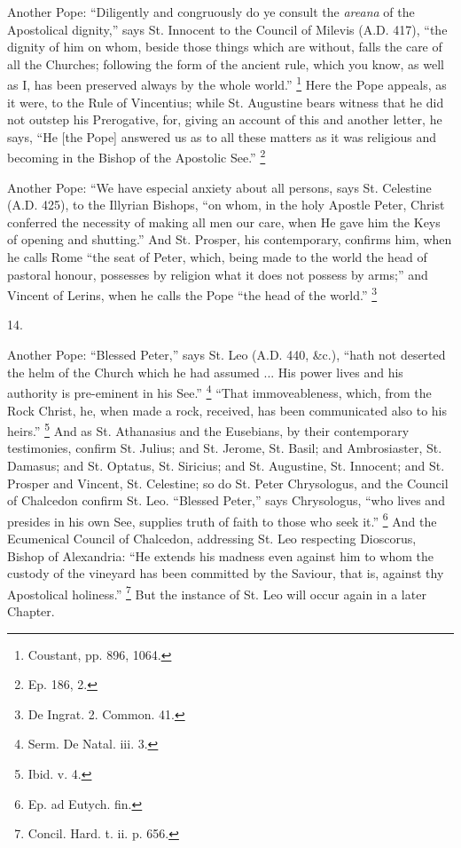 Another Pope: ``Diligently and congruously do ye
consult the \emph{areana} of the Apostolical
dignity,'' says St. Innocent to the Council of
Milevis (A.D. 417), ``the dignity of him on whom,
beside those things which are without, falls the care of
all the Churches; following the form of the ancient rule,
which you know, as well as I, has been preserved always
by the whole world.'' \footnote{Coustant, pp. 896, 1064.} Here the Pope appeals, as it
were, to the Rule of Vincentius; while St. Augustine
bears witness that he did not outstep his Prerogative,
for, giving an account of this and another letter, he
says, ``He [the Pope] answered us as to all these
matters as it was religious and becoming in the Bishop of
the Apostolic See.'' \footnote{Ep. 186, 2.}

Another Pope: ``We have especial anxiety about all
persons, says St. Celestine (A.D. 425), to the Illyrian
Bishops, ``on whom, in the holy Apostle Peter, Christ
conferred the necessity of making all men our care, when
He gave him the Keys of opening and shutting.'' And
St. Prosper, his contemporary, confirms him, when he
calls Rome ``the seat of Peter, which, being made to
the world the head of pastoral honour, possesses by
religion what it does not possess by arms;'' and
Vincent of Lerins, when he calls the Pope ``the head
of the world.'' \footnote{De Ingrat. 2. Common. 41.}

14.

Another Pope: ``Blessed Peter,'' says St. Leo (A.D. 440, \&c.), ``hath not deserted the helm of
the Church which he had assumed ... His power lives and
his authority is pre-eminent in his See.'' \footnote{Serm. De Natal. iii. 3.}
``That immoveableness, which, from the Rock Christ,
he, when made a rock, received, has been communicated
also to his heirs.'' \footnote{Ibid. v. 4.} And as St. Athanasius and
the Eusebians, by their contemporary testimonies, confirm
St. Julius; and St. Jerome, St. Basil; and Ambrosiaster,
St. Damasus; and St. Optatus, St. Siricius; and St.
Augustine, St. Innocent; and St. Prosper and Vincent, St.
Celestine; so do St. Peter Chrysologus, and the Council
of Chalcedon confirm St. Leo. ``Blessed Peter,''
says Chrysologus, ``who lives and presides in his own
See, supplies truth of faith to those who seek it.''
\footnote{Ep. ad Eutych. fin.}
And the Ecumenical Council of Chalcedon, addressing St.
Leo respecting Dioscorus, Bishop of Alexandria: ``He
extends his madness even against him to whom the custody
of the vineyard has been committed by the Saviour, that
is, against thy Apostolical holiness.'' \footnote{Concil. Hard. t. ii. p. 656.} But
the instance of St. Leo will occur again in a later
Chapter.

